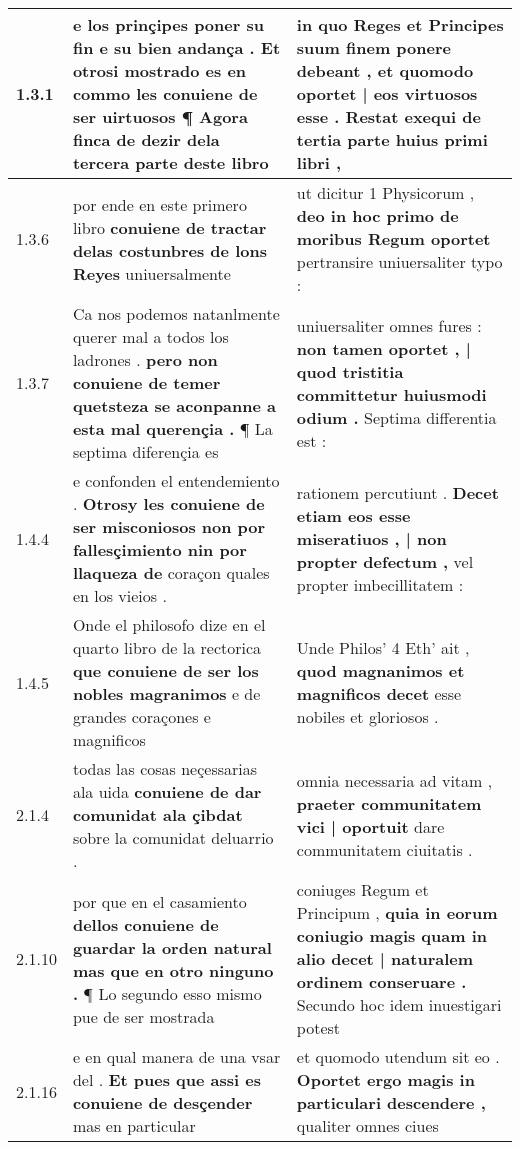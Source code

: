 \begin{tabular}{|p{1cm}|p{6.5cm}|p{6.5cm}|}
1.3.1 & e los prinçipes poner su fin e su bien andança . \textbf{ Et otrosi mostrado es en commo les conuiene de ser uirtuosos } ¶ Agora finca de dezir dela tercera parte deste libro & in quo Reges et Principes suum finem ponere debeant , \textbf{ et quomodo oportet | eos virtuosos esse . } Restat exequi de tertia parte huius primi libri , \\\hline
1.3.6 & por ende en este primero libro \textbf{ conuiene de tractar delas costunbres de lons Reyes } uniuersalmente & ut dicitur 1 Physicorum , \textbf{ deo in hoc primo de moribus Regum oportet } pertransire uniuersaliter typo : \\\hline
1.3.7 & Ca nos podemos natanlmente querer mal a todos los ladrones . \textbf{ pero non conuiene de temer quetsteza se aconpanne a esta mal querençia . } ¶ La septima diferençia es & uniuersaliter omnes fures : \textbf{ non tamen oportet , | quod tristitia committetur huiusmodi odium . } Septima differentia est : \\\hline
1.4.4 & e confonden el entendemiento . \textbf{ Otrosy les conuiene de ser misconiosos non por fallesçimiento nin por llaqueza de } coraçon quales en los vieios . & rationem percutiunt . \textbf{ Decet etiam eos esse miseratiuos , | non propter defectum , } vel propter imbecillitatem : \\\hline
1.4.5 & Onde el philosofo dize en el quarto libro de la rectorica \textbf{ que conuiene de ser los nobles magranimos } e de grandes coraçones e magnificos & Unde Philos’ 4 Eth’ ait , \textbf{ quod magnanimos et magnificos decet } esse nobiles et gloriosos . \\\hline
2.1.4 & todas las cosas neçessarias ala uida \textbf{ conuiene de dar comunidat ala çibdat } sobre la comunidat deluarrio . & omnia necessaria ad vitam , \textbf{ praeter communitatem vici | oportuit } dare communitatem ciuitatis . \\\hline
2.1.10 & por que en el casamiento \textbf{ dellos conuiene de guardar la orden natural mas que en otro ninguno . } ¶ Lo segundo esso mismo pue de ser mostrada & coniuges Regum et Principum , \textbf{ quia in eorum coniugio magis quam in alio decet | naturalem ordinem conseruare . } Secundo hoc idem inuestigari potest \\\hline
2.1.16 & e en qual manera de una vsar del . \textbf{ Et pues que assi es conuiene de desçender } mas en particular & et quomodo utendum sit eo . \textbf{ Oportet ergo magis in particulari descendere , } qualiter omnes ciues \\\hline

\end{tabular}

